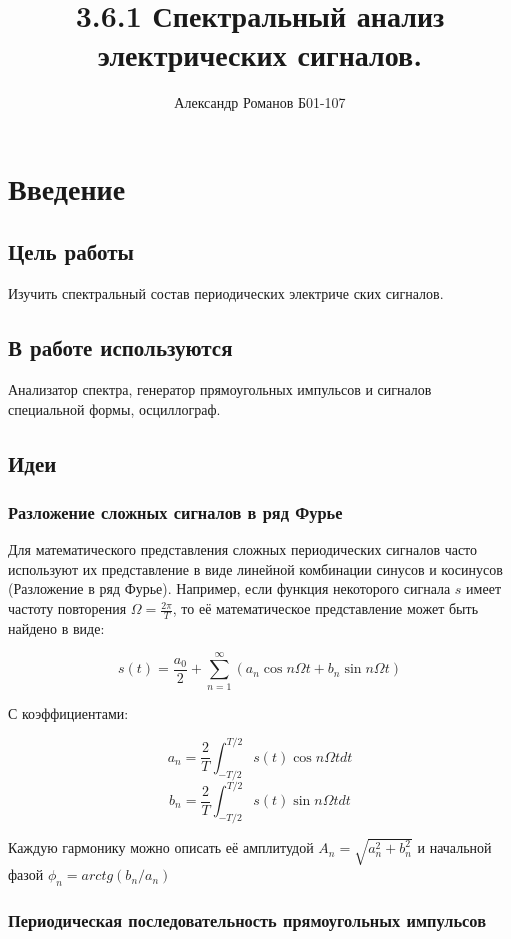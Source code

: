 \documentclass{article}
\author{Александр Романов Б01-107}
\date{}
\title{3.6.1 Спектральный анализ электрических сигналов.}
\begin{document}
\maketitle
\section{Введение}
\subsection{Цель работы}
Изучить спектральный состав периодических электриче­
ских сигналов.
\subsection{В работе используются} 
Анализатор спектра, генератор прямоугольных импульсов и сигналов специальной формы,
осциллограф.

\subsection{Идеи}
\subsubsection{Разложение сложных сигналов в ряд Фурье}
Для математического представления сложных периодических сигналов часто используют их представление
в виде линейной комбинации синусов и косинусов (Разложение в ряд Фурье). Например, если функция 
некоторого сигнала $s$ имеет частоту повторения \(\Omega = \frac{2\pi}{T}\), то её математическое
представление может быть найдено в виде:

\[ s(t) = \frac{a_0}{2} + \sum_{n=1}^{\infty}\left(a_n \cos n\Omega t + b_n \sin n\Omega t\right) \]

С коэффициентами:

\[ a_n = \frac{2}{T} \int_{-T/2}^{T/2}s(t) \cos n \Omega t dt  \]
\[ b_n = \frac{2}{T} \int_{-T/2}^{T/2}s(t) \sin n \Omega t dt  \]

Каждую гармонику можно описать её амплитудой \( A_n = \sqrt{a_n^2 + b_n^2} \) и начальной фазой 
\( \phi_n = arctg(b_n / a_n) \)

\subsubsection{Периодическая последовательность прямоугольных импульсов}
\end{document}
